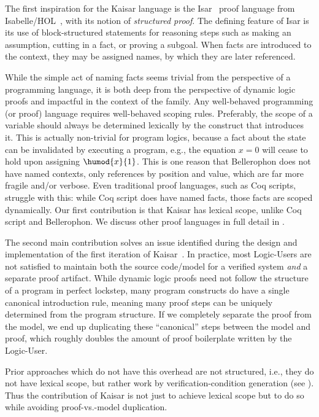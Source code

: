 \documentclass[12pt]{cmuthesis}
\theoremstyle{definition}
\theoremstyle{remark}
\newcommand{\rref}[2][]{\prettyref{#2}}
\begin{document}
The first inspiration for the Kaisar language is the Isar~\cite{Wenzel07isabelle/isar} proof language from Isabelle/HOL~\cite{DBLP:books/sp/NipkowPW02}, with its notion of \emph{structured proof}.
The defining feature of Isar is its use of block-structured statements for reasoning steps such as making an assumption, cutting in a fact, or proving a subgoal.
When facts are introduced to the context, they may be assigned names, by which they are later referenced.

While the simple act of naming facts seems trivial from the perspective of a programming language, it is both deep from the perspective of dynamic logic proofs and impactful in the context of the \dL family.
Any well-behaved programming (or proof) language requires well-behaved scoping rules.
Preferably, the scope of a variable should always be determined lexically by the construct that introduces it.
This is actually non-trivial for program logics, because a fact about the state can be invalidated by executing a program, e.g., the equation $x=0$ will cease to hold upon assigning $\humod{x}{1}$.
This is one reason that Bellerophon does not have named contexts, only references by position and value, which are far more fragile and/or verbose.
Even traditional proof languages, such as Coq scripts, struggle with this: while Coq script does have named facts, those facts are scoped dynamically.
Our first contribution is that Kaisar has lexical scope, unlike Coq script and Bellerophon.
We discuss other proof languages in full detail in \rref{sec:kaisar-relwork}.

The second main contribution solves an issue identified during the design and implementation of the first iteration of Kaisar~\cite{DBLP:journals/corr/abs-1908-05535}.
In practice, most Logic-Users are not satisfied to maintain both the source code/model for a verified system \emph{and} a separate proof artifact.
While dynamic logic proofs need not follow the structure of a program in perfect lockstep, many program constructs do have a single canonical introduction rule, meaning many proof steps can be uniquely determined from the program structure.
If we completely separate the proof from the model, we end up duplicating these ``canonical'' steps between the model and proof, which roughly doubles the amount of proof boilerplate written by the Logic-User.

Prior approaches which do not have this overhead are not structured, i.e., they do not have lexical scope, but rather work by verification-condition generation (see \rref{sec:kaisar-relwork}).
Thus the contribution of Kaisar is not just to achieve lexical scope but to do so while avoiding proof-vs.-model duplication.
\end{document}

